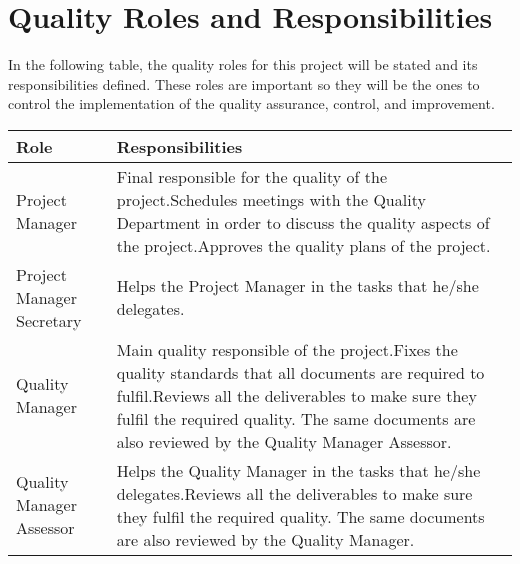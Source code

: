 \section{Quality Roles and Responsibilities}
In the following table, the quality roles for this project will be stated and its responsibilities defined. These roles are important so they will be the ones to control the implementation of the quality assurance, control, and improvement.

\begin{longtable}[H]{>{\raggedright\arraybackslash}p{5cm} p{9cm}}
	
	\toprule[2pt]
	
	\textbf{Role} &  \textbf{Responsibilities}\\
	
	\midrule [1.5pt]
	\endhead
	
	Project Manager & Final responsible for the quality of the project.\vspace{0.3cm}\newline Schedules meetings with the Quality Department in order to discuss the quality aspects of the project.\vspace{0.3cm}\newline Approves the quality plans of the project.\vspace{0.2cm} \\
	
	\midrule
		
	Project Manager Secretary & Helps the Project Manager in the tasks that he/she delegates.\vspace{0.2cm} \\
	
	\midrule
	
	Quality Manager & Main quality responsible of the project.\vspace{0.3cm}\newline Fixes the quality standards that all documents are required to fulfil.\vspace{0.3cm}\newline Reviews all the deliverables to make sure they fulfil the required quality. The same documents are also reviewed by the Quality Manager Assessor.\vspace{0.2cm} \\

	\midrule
	
	Quality Manager Assessor & Helps the Quality Manager in the tasks that he/she delegates.\vspace{0.3cm}\newline Reviews all the deliverables to make sure they fulfil the required quality. The same documents are also reviewed by the Quality Manager.\vspace{0.2cm} \\
	

\end{longtable}
